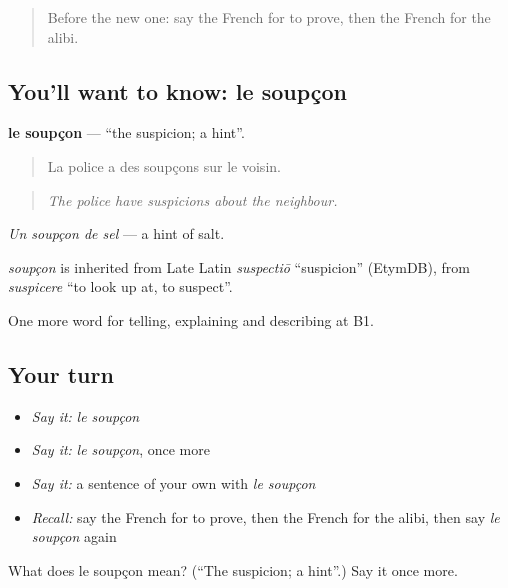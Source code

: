 \label{lesson:FR-C293-soupcon}



\begin{quote}
Before the new one: say the French for to prove, then the French for the alibi.
\end{quote}

\subsection*{You'll want to know: le soupçon}
\textbf{le soupçon} — \textquotedblleft{}the suspicion; a hint\textquotedblright{}.

\begin{quote}
La police a des soupçons sur le voisin.
\end{quote}

\begin{quote}
\emph{The police have suspicions about the neighbour.}
\end{quote}

\emph{Un soupçon de sel} — a hint of salt.

\begin{cousinweb}
\emph{soupçon} is inherited from Late Latin \emph{suspectiō} \textquotedblleft{}suspicion\textquotedblright{} (EtymDB), from \emph{suspicere} \textquotedblleft{}to look up at, to suspect\textquotedblright{}.
\end{cousinweb}

\begin{grammarlens}[title={What you've built}]
One more word for telling, explaining and describing at B1.
\end{grammarlens}

\subsection*{Your turn}
\begin{itemize}
\raggedright
  \item \emph{Say it:} \emph{le soupçon}
  \item \emph{Say it:} \emph{le soupçon}, once more
  \item \emph{Say it:} a sentence of your own with \emph{le soupçon}
  \item \emph{Recall:} say the French for to prove, then the French for the alibi, then say \emph{le soupçon} again
\end{itemize}

\begin{tcolorbox}[breakable,colback=teal!4,colframe=teal!35!black,title={Before you move on}]
What does le soupçon mean? (\textquotedblleft{}The suspicion; a hint\textquotedblright{}.) Say it once more.
\end{tcolorbox}
